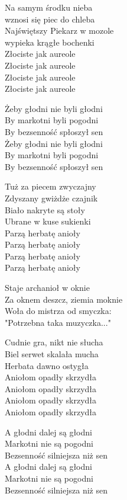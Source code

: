 \begin{text}
    Na samym środku nieba\\
    wznosi się piec do chleba\\
    Najświętszy Piekarz w mozole\\
    wypieka krągłe bochenki\\
    Złociste jak aureole\\
    Złociste jak aureole\\
    Złociste jak aureole\\
    Złociste jak aureole

    \vin Żeby głodni nie byli głodni\\
    \vin By markotni byli pogodni\\
    \vin By bezsenność spłoszył sen\\
    \vin Żeby głodni nie byli głodni\\
    \vin By markotni byli pogodni\\
    \vin By bezsenność spłoszył sen

    \hfill\break
    Tuż za piecem zwyczajny\\
    Zdyszany gwiżdże czajnik\\
    Biało nakryte są stoły\\
    Ubrane w kuse sukienki\\
    Parzą herbatę anioły\\
    Parzą herbatę anioły\\
    Parzą herbatę anioły\\
    Parzą herbatę anioły

    Staje archanioł w oknie\\
    Za oknem deszcz, ziemia moknie\\
    Woła do mistrza od smyczka:\\
    "Potrzebna taka muzyczka..."

    Cudnie gra, nikt nie słucha\\
    Biel serwet skalała mucha\\
    Herbata dawno ostygła\\
    Aniołom opadły skrzydła\\
    Aniołom opadły skrzydła\\
    Aniołom opadły skrzydła\\
    Aniołom opadły skrzydła

    A głodni dalej są głodni\\
    Markotni nie są pogodni\\
    Bezsenność silniejsza niż sen\\
    A głodni dalej są głodni\\
    Markotni nie są pogodni\\
    Bezsenność silniejsza niż sen
\end{text}
